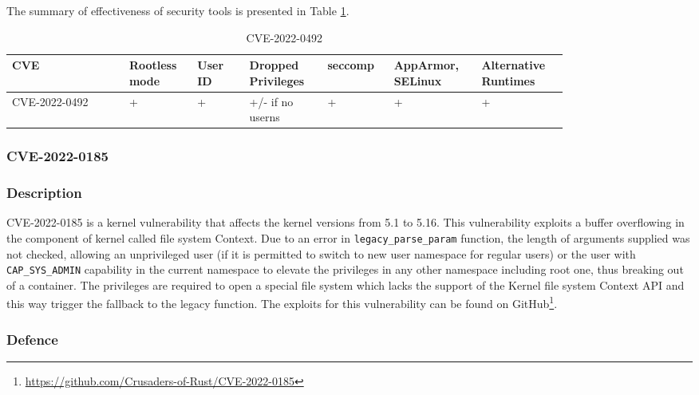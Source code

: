 The summary of effectiveness of security tools is presented in Table \ref{tab:h:2}.

\begin{table}[H]
    \centering \small
    \begin{tabular}{| p{0.18\linewidth} | p{0.1\linewidth} | p{0.08\linewidth} | p{0.12\linewidth} | p{0.09\linewidth} | p{0.12\linewidth} | p{0.12\linewidth} |} \hline
    CVE & Rootless mode & User ID & Dropped Privileges & seccomp & AppArmor, SELinux & Alternative Runtimes \\ \hline
    CVE-2022-0492 & \cellcolor{green!25} + & \cellcolor{green!25} + & \cellcolor{yellow!25} +/- \linebreak if no userns & \cellcolor{green!25} + & \cellcolor{green!25} + & \cellcolor{green!25} + \\ \hline
    \end{tabular}
    \caption{CVE-2022-0492}
    \label{tab:h:2}
\end{table}

\subsubsection{CVE-2022-0185}
\subsubsection*{Description}

CVE-2022-0185 is a kernel vulnerability that affects the kernel versions from 5.1 to 5.16. This vulnerability exploits a buffer overflowing in the component of kernel called file system Context. Due to an error in \texttt{legacy\_parse\_param} function, the length of arguments supplied was not checked, allowing an unprivileged user (if it is permitted to switch to new user namespace for regular users) or the user with \texttt{CAP\_SYS\_ADMIN} capability in the current namespace to elevate the privileges in any other namespace including root one, thus breaking out of a container. The privileges are required to open a special file system which lacks the support of the Kernel file system Context API and this way trigger the fallback to the legacy function. The exploits for this vulnerability can be found on GitHub\footnote{\url{https://github.com/Crusaders-of-Rust/CVE-2022-0185}}.

\subsubsection*{Defence}

